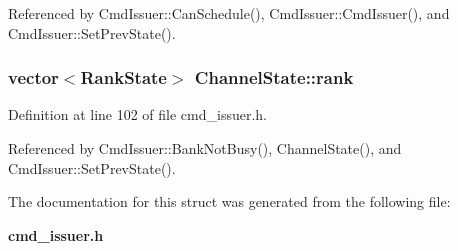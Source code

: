 Referenced by CmdIssuer::CanSchedule(), CmdIssuer::CmdIssuer(), and CmdIssuer::SetPrevState().
\subsubsection[{rank}]{\setlength{\rightskip}{0pt plus 5cm}vector$<${\bf RankState}$>$ {\bf ChannelState::rank}}\label{structChannelState_6294b7bb98764df9f1d6fea652602f3e}




Definition at line 102 of file cmd\_\-issuer.h.

Referenced by CmdIssuer::BankNotBusy(), ChannelState(), and CmdIssuer::SetPrevState().

The documentation for this struct was generated from the following file:\begin{CompactItemize}
\item 
{\bf cmd\_\-issuer.h}\end{CompactItemize}
